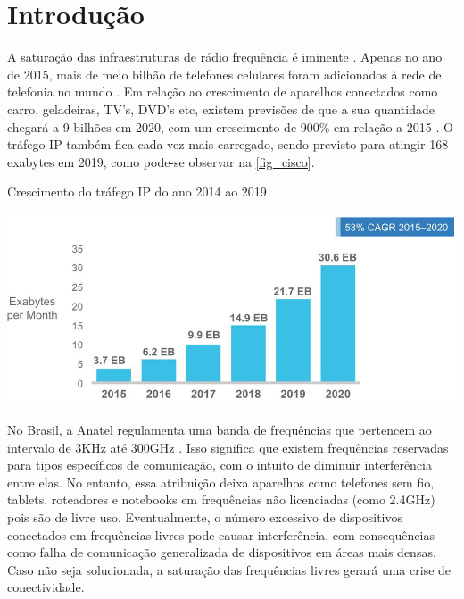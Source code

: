 	\chapter*[Introdução]{Introdução} %
		
	A saturação das infraestruturas de rádio frequência é iminente \cite{load-balancing}. Apenas no ano de 2015, mais de meio bilhão de telefones celulares foram adicionados à rede de telefonia no mundo \cite{cisco-forecast}. Em relação ao crescimento de aparelhos conectados como carro, geladeiras, TV’s, DVD’s etc, existem previsões de que a sua quantidade chegará a 9 bilhões em 2020, com um crescimento 	de 900\% em relação a 2015 \cite{erricson-report}. O tráfego IP também fica cada vez mais carregado, sendo previsto para atingir 168 exabytes em 2019, como pode-se observar na \autoref{fig_cisco}.
	
	\begin{chart}[ht!]
		\caption{\label{fig_cisco}Crescimento do tráfego IP do ano 2014 ao 2019}
		\begin{center}
			\includegraphics[scale=0.5]{cisco_exabytes_per_month.png}
		\end{center}
	\end{chart}
	
	No Brasil, a Anatel regulamenta uma banda de frequências que pertencem ao intervalo  de 3KHz até 300GHz \cite{faixa-anatel}. Isso significa que existem frequências reservadas para tipos específicos de comunicação, com o intuito de diminuir interferência entre elas. No entanto, essa atribuição deixa aparelhos como telefones sem fio, tablets, roteadores e notebooks em frequências não licenciadas (como 2.4GHz) pois são de livre uso. Eventualmente, o número excessivo de dispositivos conectados em  frequências livres pode causar interferência, com consequências como falha de comunicação generalizada de dispositivos em áreas mais densas. Caso não seja solucionada, a saturação das frequências livres gerará uma crise de conectividade. \par 
	
